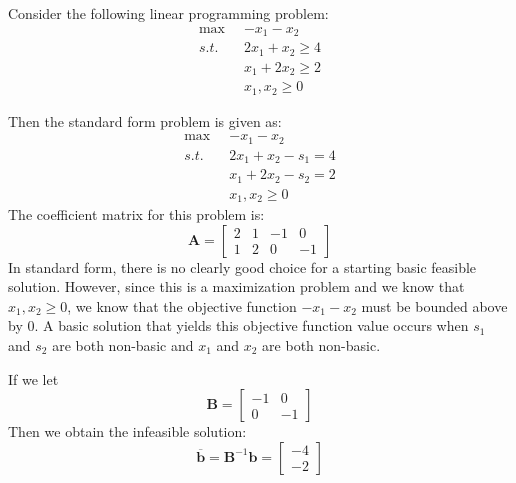 \begin{example}
Consider the following linear programming problem:
\begin{displaymath}
\begin{aligned}
\max\;\;& -x_1 - x_2\\
s.t.\;\; &2x_1 + x_2 \geq 4\\
&x_1 + 2x_2 \geq 2\\
&x_1 , x_2 \geq 0
\end{aligned}
\end{displaymath}

Then the standard form problem is given as:
\begin{displaymath}
\begin{aligned}
\max\;\;& -x_1 - x_2\\
s.t.\;\; &2x_1 + x_2 - s_1 = 4\\
&x_1 + 2x_2 - s_2 = 2\\
&x_1, x_2 \geq 0
\end{aligned}
\end{displaymath}
The coefficient matrix for this problem is:
\begin{displaymath}
\mathbf{A} = \begin{bmatrix}
2 & 1 & -1 & 0\\
1 & 2 & 0 & -1
\end{bmatrix}
\end{displaymath}
In standard form, there is no clearly good choice for a starting basic feasible solution. However, since this is a maximization problem and we know that $x_1,x_2 \geq 0$, we know that the objective function $-x_1 - x_2$ must be bounded above by $0$. A basic solution that yields this objective function value occurs when $s_1$ and $s_2$ are both non-basic and $x_1$ and $x_2$ are both non-basic. 

If we let 
\begin{displaymath}
\mathbf{B} = \begin{bmatrix}-1 & 0\\0 & -1\end{bmatrix}
\end{displaymath}
Then we obtain the infeasible solution:
\begin{displaymath}
\overline{\mathbf{b}} = \mathbf{B}^{-1}\mathbf{b} = 
\begin{bmatrix}-4 \\ -2\end{bmatrix}
\end{displaymath}


\end{example}
